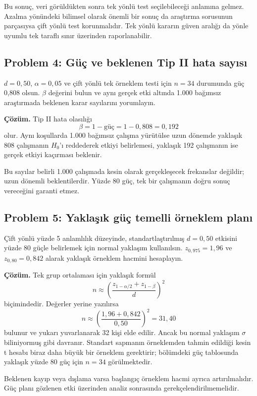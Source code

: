 Bu sonuç, veri görüldükten sonra tek yönlü test seçilebileceği anlamına
gelmez. Azalma yönündeki bilimsel olarak önemli bir sonuç da araştırma
sorusunun parçasıysa çift yönlü test korunmalıdır. Tek yönlü kararın güven
aralığı da yönle uyumlu tek taraflı sınır üzerinden raporlanabilir.

\subsection*{Problem 4: Güç ve beklenen Tip II hata sayısı}

$d=0{,}50$, $\alpha=0{,}05$ ve çift yönlü tek örneklem \tstat testi için $n=34$
durumunda güç 0,808 olsun. $\beta$ değerini bulun ve aynı gerçek etki altında
1.000 bağımsız araştırmada beklenen karar sayılarını yorumlayın.

\textbf{Çözüm.} Tip II hata olasılığı
\[
\beta=1-\text{güç}=1-0{,}808=0{,}192
\]
olur. Aynı koşullarda 1.000 bağımsız çalışma yürütülse uzun dönemde yaklaşık
808 çalışmanın $H_0$'ı reddederek etkiyi belirlemesi, yaklaşık 192 çalışmanın
ise gerçek etkiyi kaçırması beklenir.

Bu sayılar belirli 1.000 çalışmada kesin olarak gerçekleşecek frekanslar
değildir; uzun dönemli beklentilerdir. Yüzde 80 güç, tek bir çalışmanın doğru
sonuç vereceğini garanti etmez.

\subsection*{Problem 5: Yaklaşık güç temelli örneklem planı}

Çift yönlü yüzde 5 anlamlılık düzeyinde, standartlaştırılmış $d=0{,}50$
etkisini yüzde 80 güçle belirlemek için normal yaklaşım kullanılsın.
$z_{0{,}975}=1{,}96$ ve $z_{0{,}80}=0{,}842$ alarak yaklaşık örneklem hacmini
hesaplayın.

\textbf{Çözüm.} Tek grup ortalaması için yaklaşık formül
\[
n\approx\left(\frac{z_{1-\alpha/2}+z_{1-\beta}}{d}\right)^2
\]
biçimindedir. Değerler yerine yazılırsa
\[
n\approx\left(\frac{1{,}96+0{,}842}{0{,}50}\right)^2
=31{,}40
\]
bulunur ve yukarı yuvarlanarak 32 kişi elde edilir. Ancak bu normal yaklaşım
$\sigma$ biliniyormuş gibi davranır. Standart sapmanın örneklemden tahmin
edildiği kesin t hesabı biraz daha büyük bir örneklem gerektirir; bölümdeki
güç tablosunda yaklaşık yüzde 80 güç için $n=34$ görülmektedir.

Beklenen kayıp veya dışlama varsa başlangıç örneklem hacmi ayrıca
artırılmalıdır. Güç planı gözlenen etki üzerinden analiz sonrasında
gerekçelendirilmemelidir.

